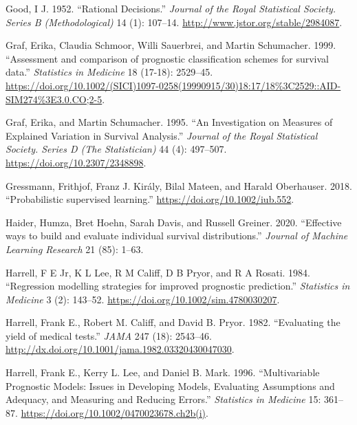\documentclass[
  letterpaper,
]{scrbook}
\newlength{\cslhangindent}
\newlength{\cslentryspacingunit} %
\newenvironment{CSLReferences}[2] %
 {%
  \setlength{\parindent}{0pt}
  \ifodd #1
  \let\oldpar\par
  \def\par{\hangindent=\cslhangindent\oldpar}
  \fi
  \setlength{\parskip}{#2\cslentryspacingunit}
 }%
 {}
\theoremstyle{plain}
\theoremstyle{definition}
\theoremstyle{remark}
\begin{document}
\begin{CSLReferences}{1}{0}
\leavevmode{}%
Good, I J. 1952. {``{Rational Decisions}.''} \emph{Journal of the Royal
Statistical Society. Series B (Methodological)} 14 (1): 107--14.
\url{http://www.jstor.org/stable/2984087}.

\leavevmode{}%
Graf, Erika, Claudia Schmoor, Willi Sauerbrei, and Martin Schumacher.
1999. {``{Assessment and comparison of prognostic classification schemes
for survival data}.''} \emph{Statistics in Medicine} 18 (17-18):
2529--45.
\url{https://doi.org/10.1002/(SICI)1097-0258(19990915/30)18:17/18\%3C2529::AID-SIM274\%3E3.0.CO;2-5}.

\leavevmode{}%
Graf, Erika, and Martin Schumacher. 1995. {``{An Investigation on
Measures of Explained Variation in Survival Analysis}.''} \emph{Journal
of the Royal Statistical Society. Series D (The Statistician)} 44 (4):
497--507. \url{https://doi.org/10.2307/2348898}.

\leavevmode{}%
Gressmann, Frithjof, Franz J. Király, Bilal Mateen, and Harald
Oberhauser. 2018. {``{Probabilistic supervised learning}.''}
\url{https://doi.org/10.1002/iub.552}.

\leavevmode{}%
Haider, Humza, Bret Hoehn, Sarah Davis, and Russell Greiner. 2020.
{``{Effective ways to build and evaluate individual survival
distributions}.''} \emph{Journal of Machine Learning Research} 21 (85):
1--63.

\leavevmode{}%
Harrell, F E Jr, K L Lee, R M Califf, D B Pryor, and R A Rosati. 1984.
{``{Regression modelling strategies for improved prognostic
prediction.}''} \emph{Statistics in Medicine} 3 (2): 143--52.
\url{https://doi.org/10.1002/sim.4780030207}.

\leavevmode{}%
Harrell, Frank E., Robert M. Califf, and David B. Pryor. 1982.
{``{Evaluating the yield of medical tests}.''} \emph{JAMA} 247 (18):
2543--46. \url{http://dx.doi.org/10.1001/jama.1982.03320430047030}.

\leavevmode{}%
Harrell, Frank E., Kerry L. Lee, and Daniel B. Mark. 1996.
{``{Multivariable Prognostic Models: Issues in Developing Models,
Evaluating Assumptions and Adequacy, and Measuring and Reducing
Errors}.''} \emph{Statistics in Medicine} 15: 361--87.
\url{https://doi.org/10.1002/0470023678.ch2b(i)}.


\end{CSLReferences}
\end{document}
